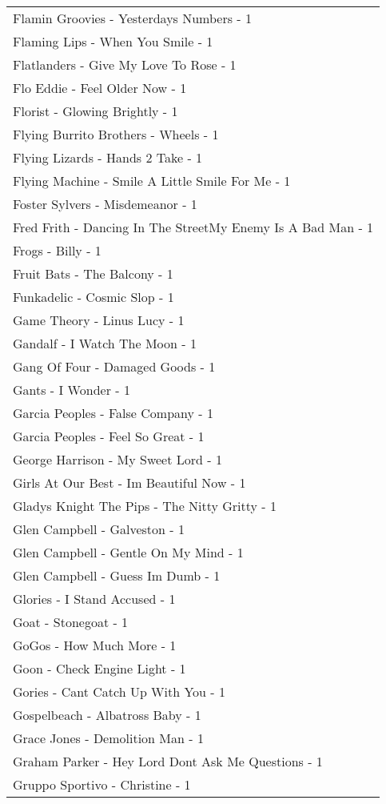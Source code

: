 \documentclass[
]{article}
\begin{document}
\begin{longtable}{l}
Flamin Groovies - Yesterdays Numbers - 1 \\ 
Flaming Lips - When You Smile - 1 \\ 
Flatlanders - Give My Love To Rose - 1 \\ 
Flo Eddie - Feel Older Now - 1 \\ 
Florist - Glowing Brightly - 1 \\ 
Flying Burrito Brothers - Wheels - 1 \\ 
Flying Lizards - Hands 2 Take - 1 \\ 
Flying Machine - Smile A Little Smile For Me - 1 \\ 
Foster Sylvers - Misdemeanor - 1 \\ 
Fred Frith - Dancing In The StreetMy Enemy Is A Bad Man - 1 \\ 
Frogs - Billy - 1 \\ 
Fruit Bats - The Balcony - 1 \\ 
Funkadelic - Cosmic Slop - 1 \\ 
Game Theory - Linus Lucy - 1 \\ 
Gandalf - I Watch The Moon - 1 \\ 
Gang Of Four - Damaged Goods - 1 \\ 
Gants - I Wonder - 1 \\ 
Garcia Peoples - False Company - 1 \\ 
Garcia Peoples - Feel So Great - 1 \\ 
George Harrison - My Sweet Lord - 1 \\ 
Girls At Our Best - Im Beautiful Now - 1 \\ 
Gladys Knight The Pips - The Nitty Gritty - 1 \\ 
Glen Campbell - Galveston - 1 \\ 
Glen Campbell - Gentle On My Mind - 1 \\ 
Glen Campbell - Guess Im Dumb - 1 \\ 
Glories - I Stand Accused - 1 \\ 
Goat - Stonegoat - 1 \\ 
GoGos - How Much More - 1 \\ 
Goon - Check Engine Light - 1 \\ 
Gories - Cant Catch Up With You - 1 \\ 
Gospelbeach - Albatross Baby - 1 \\ 
Grace Jones - Demolition Man - 1 \\ 
Graham Parker - Hey Lord Dont Ask Me Questions - 1 \\ 
Gruppo Sportivo - Christine - 1 \\ 

\end{longtable}
\end{document}
